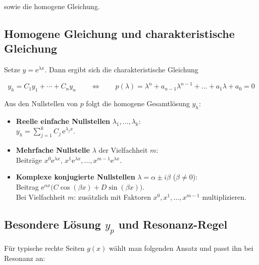 \documentclass[a4paper,11pt,oneside,open=any,parskip=half, DIV=15]{scrreprt}
\begin{document}
   sowie die homogene Gleichung.

   \subsection*{Homogene Gleichung und charakteristische Gleichung}
      Setze \(y=\mathrm e^{\lambda x}\). Dann ergibt sich die charakteristische Gleichung
      \begin{importantbox}
         \[
            y_h = C_1 y_1 + \cdots + C_n y_n
            \qquad\Longleftrightarrow\qquad
            p(\lambda)=\lambda^{n}+a_{n-1}\lambda^{n-1}+\dots+a_1\lambda+a_0=0   %
         \]
      \end{importantbox}

      Aus den Nullstellen von \(p\) folgt die homogene Gesamtlösung \(y_h\):
      \begin{importantbox}
         \begin{itemize}[leftmargin=1.2em]
         \item \textbf{Reelle einfache Nullstellen} \(\lambda_1,\dots,\lambda_k\):\\
         \(y_h=\sum_{j=1}^{k} C_j\,\mathrm e^{\lambda_j x}\).
         \item \textbf{Mehrfache Nullstelle} \(\lambda\) der Vielfachheit \(m\):\\
         Beiträge \(x^{0}\mathrm e^{\lambda x},\,x^{1}\mathrm e^{\lambda x},\dots, x^{m-1}\mathrm e^{\lambda x}\).
         \item \textbf{Komplexe konjugierte Nullstellen} \(\lambda=\alpha\pm i\beta\) (\(\beta\neq 0\)):\\
         Beitrag \( \mathrm e^{\alpha x}\bigl(C\cos(\beta x)+D\sin(\beta x)\bigr)\).\\
         Bei Vielfachheit \(m\): zusätzlich mit Faktoren \(x^{0}, x^{1},\dots,x^{m-1}\) multiplizieren.
         \end{itemize}
      \end{importantbox}

   \subsection*{Besondere Lösung \(y_p\) und Resonanz-Regel}
      Für typische rechte Seiten \(g(x)\) wählt man folgenden Ansatz und passt ihn bei Resonanz an:
      
\end{document}

